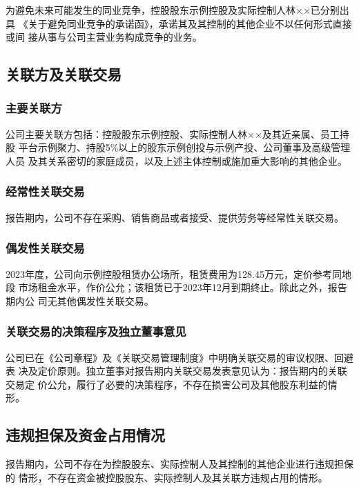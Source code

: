 为避免未来可能发生的同业竞争，控股股东示例控股及实际控制人林××已分别出具
《关于避免同业竞争的承诺函》，承诺其及其控制的其他企业不以任何形式直接或间
接从事与公司主营业务构成竞争的业务。

\subsection{关联方及关联交易}

\subsubsection{主要关联方}

公司主要关联方包括：控股股东示例控股、实际控制人林××及其近亲属、员工持股
平台示例聚力、持股5\%以上的股东示例创投与示例产投、公司董事及高级管理人员
及其关系密切的家庭成员，以及上述主体控制或施加重大影响的其他企业。

\subsubsection{经常性关联交易}

报告期内，公司不存在采购、销售商品或者接受、提供劳务等经常性关联交易。

\subsubsection{偶发性关联交易}

2023年度，公司向示例控股租赁办公场所，租赁费用为128.45万元，定价参考同地段
市场租金水平，作价公允；该租赁已于2023年12月到期终止。除此之外，报告期内公
司无其他偶发性关联交易。

\subsubsection{关联交易的决策程序及独立董事意见}

公司已在《公司章程》及《关联交易管理制度》中明确关联交易的审议权限、回避表
决及定价原则。独立董事对报告期内关联交易发表意见认为：报告期内的关联交易定
价公允，履行了必要的决策程序，不存在损害公司及其他股东利益的情形。

\subsection{违规担保及资金占用情况}

报告期内，公司不存在为控股股东、实际控制人及其控制的其他企业进行违规担保的
情形，不存在资金被控股股东、实际控制人及其关联方违规占用的情形。
